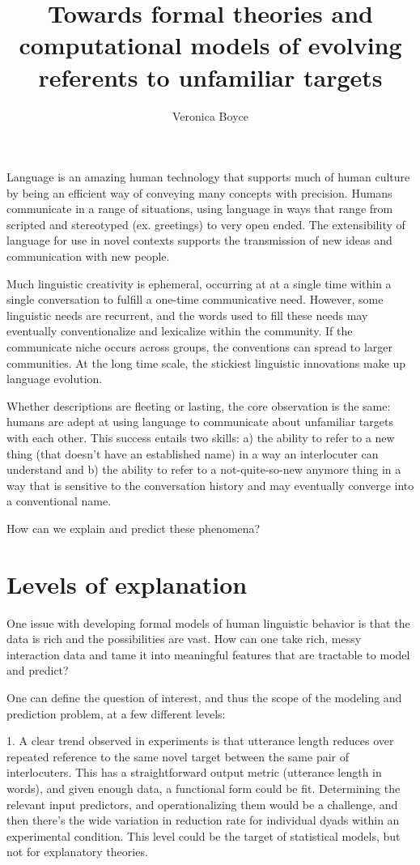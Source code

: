 \documentclass[]{article}
\title{Towards formal theories and computational models of evolving referents to unfamiliar targets}
\author{Veronica Boyce}
\begin{document}
	
	\maketitle
	
	
	Language is an amazing human technology that supports much of human culture by being an efficient way of conveying many concepts with precision. Humans communicate in a range of situations, using language in ways that range from scripted and stereotyped (ex. greetings) to very open ended. The extensibility of language for use in novel contexts supports the transmission of new ideas and communication with new people. 
	
	Much linguistic creativity is ephemeral, occurring at at a single time within a single conversation to fulfill a one-time communicative need.  However, some linguistic needs are recurrent, and the words used to fill these needs may eventually conventionalize and lexicalize within the community. If the communicate niche occurs across groups, the conventions can spread to larger communities.  At the long time scale, the stickiest linguistic innovations make up language evolution. 
	
	Whether descriptions are fleeting or lasting, the core observation is the same: humans are adept at using language to communicate about unfamiliar targets with each other. This success entails two skills: a) the ability to refer to a new thing (that doesn't have an established name) in a way an interlocuter can understand and b) the ability to refer to a not-quite-so-new anymore thing in a way that is sensitive to the conversation history and may eventually converge into a conventional name. 
	
	How can we explain and predict these phenomena?
	
	\section{Levels of explanation}
	One issue with developing formal models of human linguistic behavior is that the data is rich and the possibilities are vast. How can one take rich, messy interaction data and tame it into meaningful features that are tractable to model and predict? 
	
	One can define the question of interest, and thus the scope of the modeling and prediction problem, at a few different levels:
	
	1. A clear trend observed in experiments is that utterance length reduces over repeated reference to the same novel target between the same pair of interlocuters. This has a straightforward output metric (utterance length in words), and given enough data, a functional form could be fit.  Determining the relevant input predictors, and operationalizing them would be a challenge, and then there's the wide variation in reduction rate for individual dyads within an experimental condition. This level could be the target of statistical models, but not for explanatory theories. 
	
\end{document}
